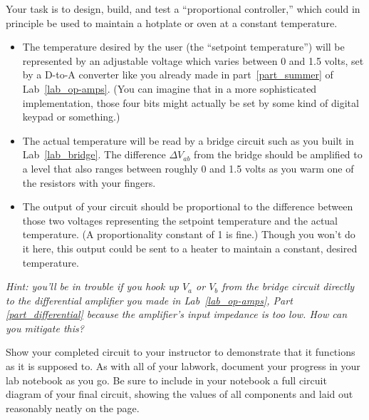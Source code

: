 Your task is to design, build, and test a ``proportional controller,'' which could in principle be used to maintain a hotplate or oven at a constant temperature.
\begin{itemize}[nosep]
\item The temperature desired by the user (the ``setpoint temperature'') will be represented by an adjustable voltage which varies between 0 and 1.5 volts, set by a D-to-A converter like you already made in part~\ref{part_summer} of Lab~\ref{lab_op-amps}.  (You can imagine that in a more sophisticated implementation, those four bits might actually be set by some kind of digital keypad or something.)
\item The actual temperature will be read by a bridge circuit such as you built in Lab~\ref{lab_bridge}.  The difference $\Delta V_{ab}$ from the bridge should be amplified to a level that also ranges between roughly 0 and 1.5 volts as you warm one of the resistors with your fingers.
\item The output of your circuit should be proportional to the difference between those two voltages representing the setpoint temperature and the actual temperature.  (A proportionality constant of 1 is fine.)  Though you won't do it here, this output could be sent to a heater to maintain a constant, desired temperature.  
\end{itemize}
\textit{Hint: you'll be in trouble if you hook up $V_a$ or $V_b$ from the bridge circuit directly to the differential amplifier you made in Lab~\ref{lab_op-amps}, Part \ref{part_differential} because the amplifier's input impedance is too low.  How can you mitigate this?} 

Show your completed circuit to your instructor to demonstrate that it functions as it is supposed to.  As with all of your labwork, document your progress in your lab notebook as you go.  Be sure to include in your notebook a full circuit diagram of your final circuit, showing the values of all components and laid out reasonably neatly on the page.